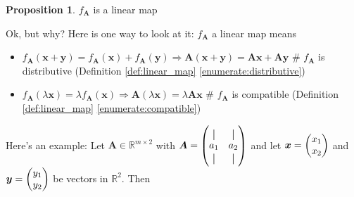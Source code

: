 \documentclass{article}
\theoremstyle{definition}
\newtheorem{proposition}{Proposition}[section]
\newcommand*{\vertbar}{\rule[-1ex]{0.5pt}{2.5ex}}
\begin{document}
\medskip
\begin{proposition}
$f_{\bm{A}}$ is a linear map

\bigskip
\noindent
Ok, but why?  Here is one way to look at it:
$f_{\bm{A}}$ a linear map means

\medskip
\begin{itemize}
\item $f_{\bm{A}}(\mathbf{x}+\mathbf{y}) = f_{\bm{A}}(\mathbf{x})+
		f_{\bm{A}}(\mathbf{y}) \Rightarrow		
		\bm{A}(\mathbf{x} + \mathbf{y}) = \bm{A}\mathbf{x} + \bm{A}\mathbf{y}$
		\hspace{4.00em} \# $f_{\bm{A}}$ is distributive (Definition \ref{def:linear_map} 
		\ref{enumerate:distributive})

\item $f_{\bm{A}}(\lambda \mathbf{x}) = \lambda f_{\bm{A}}(\mathbf{x}) \Rightarrow				
		\bm{A}(\lambda \mathbf{x}) = \lambda \bm{A}\mathbf{x}$
		\hspace{11.25em} \# $f_{\bm{A}}$ is compatible (Definition \ref{def:linear_map} 
		\ref{enumerate:compatible})
\end{itemize}

\noindent
Here's an example: Let $\bm{A} \in \mathbb{R}^{m \times 2}$ with $\bm{A} = 
	\left (
		\hspace{-0.50em}
		\begin{array}{cccc}
			\vertbar & \vertbar \\
			a_{1}    & a_{2}    \\
			\vertbar & \vertbar 
		\end{array}
		\hspace{-0.50em}
	\right )$ 
and let $\bm{x} = \left ( 
					\hspace{-0.50em}
					\begin{array}{cccc}
						x_1 \\
						x_2
					\end{array} 
					\hspace{-0.50em}
					\right )$
and 
$\bm{y} = \left ( 
					\hspace{-0.50em}
					\begin{array}{cccc}
						y_1 \\
						y_2
					\end{array} 
					\hspace{-0.50em}
					\right )$
be vectors in $\mathbb{R}^{2}$. Then



\end{proposition}
\end{document}
